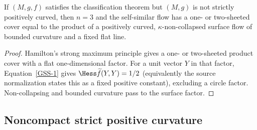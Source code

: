\begin{claim}\label{claim:non-strictly-positive-curvature-splitting}
\label{flatssplit}
If $(M,g,f)$ satisfies the classification theorem but $(M,g)$ is not
strictly positively curved, then $n=3$ and the self-similar flow has
a one- or two-sheeted cover equal to the product of a positively
curved, $\kappa$-non-collapsed surface flow of bounded curvature and
a fixed flat line.
\end{claim}
\begin{proof}
\sketch Hamilton's strong maximum principle gives a one- or
two-sheeted product cover with a flat one-dimensional factor. For a
unit vector $Y$ in that factor, Equation~\ref{GSS-1} gives
$\Hess\widetilde f(Y,Y)=1/2$ (equivalently the source normalization
states this as a fixed positive constant), excluding a circle
factor. Non-collapsing and bounded curvature pass to the surface
factor.
\end{proof}

\subsection{Noncompact strict positive curvature}\label{noncomp}

